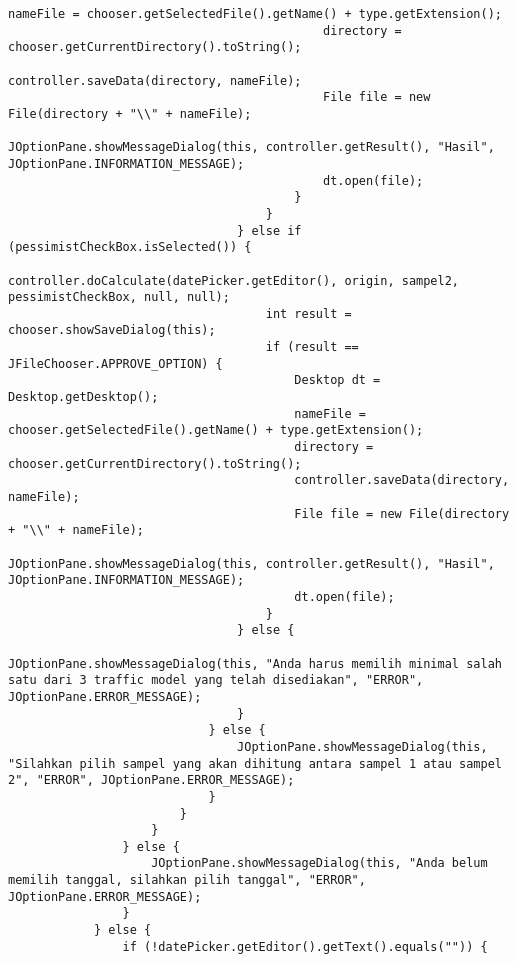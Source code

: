 \begin{lstlisting}[caption= main.java]
                                            nameFile = chooser.getSelectedFile().getName() + type.getExtension();
                                            directory = chooser.getCurrentDirectory().toString();
                                            controller.saveData(directory, nameFile);
                                            File file = new File(directory + "\\" + nameFile);
                                            JOptionPane.showMessageDialog(this, controller.getResult(), "Hasil", JOptionPane.INFORMATION_MESSAGE);
                                            dt.open(file);
                                        }
                                    }
                                } else if (pessimistCheckBox.isSelected()) {
                                    controller.doCalculate(datePicker.getEditor(), origin, sampel2, pessimistCheckBox, null, null);
                                    int result = chooser.showSaveDialog(this);
                                    if (result == JFileChooser.APPROVE_OPTION) {
                                        Desktop dt = Desktop.getDesktop();
                                        nameFile = chooser.getSelectedFile().getName() + type.getExtension();
                                        directory = chooser.getCurrentDirectory().toString();
                                        controller.saveData(directory, nameFile);
                                        File file = new File(directory + "\\" + nameFile);
                                        JOptionPane.showMessageDialog(this, controller.getResult(), "Hasil", JOptionPane.INFORMATION_MESSAGE);
                                        dt.open(file);
                                    }
                                } else {
                                    JOptionPane.showMessageDialog(this, "Anda harus memilih minimal salah satu dari 3 traffic model yang telah disediakan", "ERROR", JOptionPane.ERROR_MESSAGE);
                                }
                            } else {
                                JOptionPane.showMessageDialog(this, "Silahkan pilih sampel yang akan dihitung antara sampel 1 atau sampel 2", "ERROR", JOptionPane.ERROR_MESSAGE);
                            }
                        }
                    }
                } else {
                    JOptionPane.showMessageDialog(this, "Anda belum memilih tanggal, silahkan pilih tanggal", "ERROR", JOptionPane.ERROR_MESSAGE);
                }
            } else {
                if (!datePicker.getEditor().getText().equals("")) {

\end{lstlisting}
